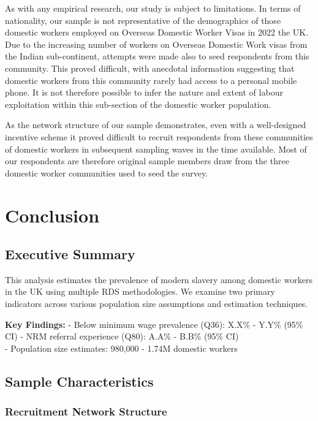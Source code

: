 \documentclass[
  12pt,
]{article}
\theoremstyle{plain}
\theoremstyle{definition}
\begin{document}
As with any empirical research, our study is subject to limitations. In
terms of nationality, our sample is not representative of the
demographics of those domestic workers employed on Overseas Domestic
Worker Visas in 2022 the UK. Due to the increasing number of workers on
Overseas Domestic Work visas from the Indian sub-continent, attempts
were made also to seed respondents from this community. This proved
difficult, with anecdotal information suggesting that domestic workers
from this community rarely had access to a personal mobile phone. It is
not therefore possible to infer the nature and extent of labour
exploitation within this sub-section of the domestic worker population.

As the network structure of our sample demonstrates, even with a
well-designed incentive scheme it proved difficult to recruit
respondents from these communities of domestic workers in subsequent
sampling waves in the time available. Most of our respondents are
therefore original sample members draw from the three domestic worker
communities used to seed the survey.

\section{Conclusion}\label{conclusion}

\newpage

\subsection{Executive Summary}\label{executive-summary}

This analysis estimates the prevalence of modern slavery among domestic
workers in the UK using multiple RDS methodologies. We examine two
primary indicators across various population size assumptions and
estimation techniques.

\textbf{Key Findings:} - Below minimum wage prevalence (Q36): X.X\% -
Y.Y\% (95\% CI) - NRM referral experience (Q80): A.A\% - B.B\% (95\%
CI)\\
- Population size estimates: 980,000 - 1.74M domestic workers

\subsection{Sample Characteristics}\label{sample-characteristics}

\subsubsection{Recruitment Network
Structure}\label{recruitment-network-structure}
\end{document}
